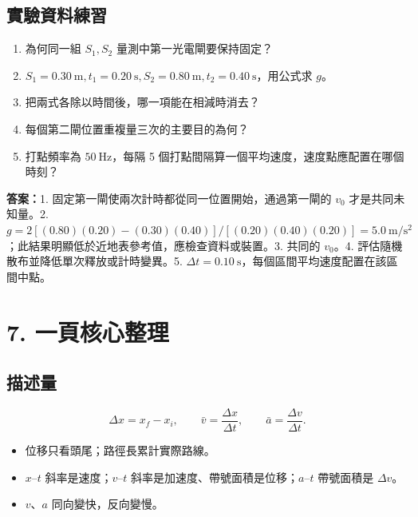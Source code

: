 \documentclass[11pt,a4paper]{article}
\providecommand{\tightlist}{%
  \setlength{\itemsep}{0pt}\setlength{\parskip}{0pt}}
\begin{document}
\begin{HandoutSelfCheck}

\subsection{實驗資料練習}\label{ux5be6ux9a57ux8cc7ux6599ux7df4ux7fd2-1}

\begin{enumerate}
\def\labelenumi{\arabic{enumi}.}
\tightlist
\item
  為何同一組 \(S_1,S_2\) 量測中第一光電閘要保持固定？
\item
  \(S_1=0.30\ \mathrm m,t_1=0.20\ \mathrm s,S_2=0.80\ \mathrm m,t_2=0.40\ \mathrm s\)，用公式求 \(g\)。
\item
  把兩式各除以時間後，哪一項能在相減時消去？
\item
  每個第二閘位置重複量三次的主要目的為何？
\item
  打點頻率為 \(50\ \mathrm{Hz}\)，每隔 5 個打點間隔算一個平均速度，速度點應配置在哪個時刻？
\end{enumerate}

\textbf{答案：}1. 固定第一閘使兩次計時都從同一位置開始，通過第一閘的 \(v_0\) 才是共同未知量。2. \(g=2[(0.80)(0.20)-(0.30)(0.40)]/[(0.20)(0.40)(0.20)]=5.0\ \mathrm{m/s^2}\)；此結果明顯低於近地表參考值，應檢查資料或裝置。3. 共同的 \(v_0\)。4. 評估隨機散布並降低單次釋放或計時變異。5. \(\Delta t=0.10\ \mathrm s\)，每個區間平均速度配置在該區間中點。

\end{HandoutSelfCheck}

\section{7. 一頁核心整理}\label{ux4e00ux9801ux6838ux5fc3ux6574ux7406}

\subsection{描述量}\label{ux63cfux8ff0ux91cf}

\[
\Delta x=x_f-x_i,
\qquad
\bar v=\frac{\Delta x}{\Delta t},
\qquad
\bar a=\frac{\Delta v}{\Delta t}.
\]

\begin{itemize}
\tightlist
\item
  位移只看頭尾；路徑長累計實際路線。
\item
  \(x\text{–}t\) 斜率是速度；\(v\text{–}t\) 斜率是加速度、帶號面積是位移；\(a\text{–}t\) 帶號面積是 \(\Delta v\)。
\item
  \(v\)、\(a\) 同向變快，反向變慢。
\end{itemize}
\end{document}
